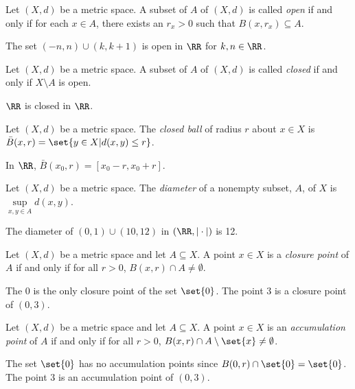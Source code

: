 \begin{definition*}
	Let $(X,d)$ be a metric space.
	A subset of $A$ of $(X,d)$ is called \textit{open} if and only if for each $x\in A$, there exists an $r_x>0$ such that $B(x,r_x)\subseteq A$.
\end{definition*}
\begin{example*}
	The set $(-n, n)\cup (k,k+1)$ is open in $\RR$ for $k,n\in\RR$.
\end{example*}

\begin{definition*}
	Let $(X,d)$ be a metric space.
	A subset of $A$ of $(X,d)$ is called \textit{closed} if and only if $X\setminus A$ is open.
\end{definition*}
\begin{example*}
	$\RR$ is closed in $\RR$.
\end{example*}

\begin{definition*}
	Let $(X,d)$ be a metric space.
	The \textit{closed ball} of radius $r$ about $x\in X$ is $\bar{B}(x,r)=\set{y\in X| d(x,y)\leq r}$.
\end{definition*}
\begin{example*}
	In $\RR$, $\bar{B}(x_0, r)=[x_0-r,x_0+r]$.
\end{example*}

\begin{definition*}
	Let $(X,d)$ be a metric space.
	The \textit{diameter} of a nonempty subset, $A$, of $X$ is $\sup\limits_{x,y\in A}d(x,y)$.
\end{definition*}
\begin{example*}
	The diameter of $(0,1)\cup(10,12)$ in $(\RR, |\cdot|)$ is 12.
\end{example*}

\begin{definition*}
	Let $(X,d)$ be a metric space and let $A\subseteq X$.
	A point $x\in X$ is a \textit{closure point} of $A$ if and only if for all $r>0$, $B(x,r)\cap A\neq\emptyset$.
\end{definition*}
\begin{example*}
	The $0$ is the only closure point of the set $\set{0}$.
	The point $3$ is a closure point of $(0,3)$.
\end{example*}

\begin{definition*}
	Let $(X,d)$ be a metric space and let $A\subseteq X$.
	A point $x\in X$ is an \textit{accumulation point} of $A$ if and only if for all $r>0$, $B(x,r)\cap A\setminus\set{x}\neq\emptyset$.
\end{definition*}
\begin{example*}
	The set $\set{0}$ has no accumulation points since $B(0,r)\cap\set{0}=\set{0}$.
	The point $3$ is an accumulation point of $(0,3)$.
\end{example*}

